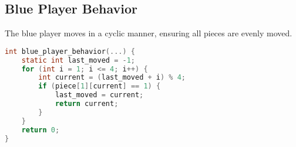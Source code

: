 \documentclass{article}
\begin{document}
\subsection{Blue Player Behavior}
The blue player moves in a cyclic manner, ensuring all pieces are evenly moved.

\begin{lstlisting}[language=C,caption={Blue Player Behavior},label={lst:blue_behavior}]
int blue_player_behavior(...) {
    static int last_moved = -1;
    for (int i = 1; i <= 4; i++) {
        int current = (last_moved + i) % 4;
        if (piece[1][current] == 1) {
            last_moved = current;
            return current;
        }
    }
    return 0;
}
\end{lstlisting}
\end{document}
